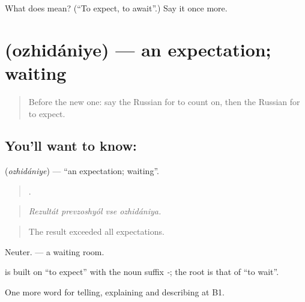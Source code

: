 \begin{tcolorbox}[breakable,colback=teal!4,colframe=teal!35!black,title={Before you move on}]
What does  mean? (\textquotedblleft{}To expect, to await\textquotedblright{}.) Say it once more.
\end{tcolorbox}
\section[\texorpdfstring{\ru{ожидание} (ozhidániye)}{ожидание (ozhidániye)}]{ (ozhidániye) — an expectation; waiting}

\label{lesson:RU-C374-ozhidanie}



\begin{quote}
Before the new one: say the Russian for to count on, then the Russian for to expect.
\end{quote}

\subsection*{You'll want to know: }
\textbf{} (\emph{ozhidániye}) — \textquotedblleft{}an expectation; waiting\textquotedblright{}.

\begin{quote}
   .
\end{quote}

\begin{quote}
\emph{Rezultát prevzoshyól vse ozhidániya.}
\end{quote}

\begin{quote}
The result exceeded all expectations.
\end{quote}

Neuter. \emph{ } — a waiting room.

\begin{cousinweb}
\textbf{} is built on \emph{} \textquotedblleft{}to expect\textquotedblright{} with the noun suffix \emph{-}; the root is that of \emph{} \textquotedblleft{}to wait\textquotedblright{}.
\end{cousinweb}

\begin{grammarlens}[title={What you've built}]
One more word for telling, explaining and describing at B1.
\end{grammarlens}

